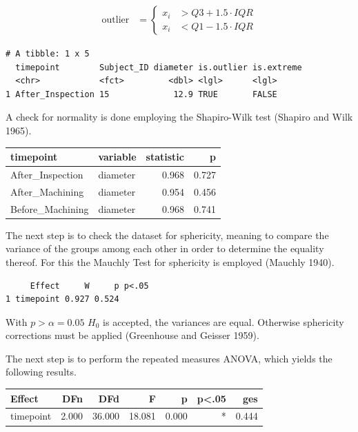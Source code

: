 \documentclass[
  a4paper,
]{scrbook}
\begin{document}
\begin{align}
\text{outlier} &=
\begin{cases}
x_i & >Q3 + 1.5 \cdot IQR \\
x_i & <Q1 - 1.5 \cdot IQR
\end{cases}
\label{outlierrule}
\end{align}

\begin{verbatim}
# A tibble: 1 x 5
  timepoint        Subject_ID diameter is.outlier is.extreme
  <chr>            <fct>         <dbl> <lgl>      <lgl>     
1 After_Inspection 15             12.9 TRUE       FALSE     
\end{verbatim}

A check for normality is done employing the Shapiro-Wilk test (Shapiro
and Wilk 1965).

\begin{longtable}[]{@{}llrr@{}}
\toprule\noalign{}
timepoint & variable & statistic & p \\
\midrule\noalign{}
\endhead
\bottomrule\noalign{}
\endlastfoot
After\_Inspection & diameter & 0.968 & 0.727 \\
After\_Machining & diameter & 0.954 & 0.456 \\
Before\_Machining & diameter & 0.968 & 0.741 \\
\end{longtable}

The next step is to check the dataset for sphericity, meaning to compare
the variance of the groups among each other in order to determine the
equality thereof. For this the Mauchly Test for sphericity is employed
(Mauchly 1940).

\begin{verbatim}
     Effect     W     p p<.05
1 timepoint 0.927 0.524      
\end{verbatim}

With \(p>\alpha = 0.05\) \(H_0\) is accepted, the variances are equal.
Otherwise sphericity corrections must be applied (Greenhouse and Geisser
1959).

The next step is to perform the repeated measures ANOVA, which yields
the following results.

\begin{longtable}[]{@{}lrrrrrr@{}}
\toprule\noalign{}
Effect & DFn & DFd & F & p & p\textless.05 & ges \\
\midrule\noalign{}
\endhead
\bottomrule\noalign{}
\endlastfoot
timepoint & 2.000 & 36.000 & 18.081 & 0.000 & * & 0.444 \\
\end{longtable}
\end{document}
